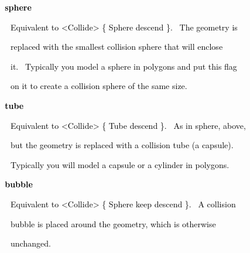 \documentclass[a4paper]{article}
\newcommand\textstyleOOoComputerKeyWord[1]{\textrm{\textcolor[rgb]{0.0,0.0,0.5019608}{#1}}}
\begin{document}
\clearpage
\bigskip


\bigskip

{\bfseries
\hypertarget{RefHeading7714869075401}{}\textstyleOOoComputerKeyWord{\textcolor{black}{\ \ \ \ sphere}}}


\bigskip

{\color{black}
\textstyleOOoComputerKeyWord{\textcolor{black}{\ \ \ \ \ \ Equivalent to {\textless}Collide{\textgreater} \{ Sphere
descend \}. \ The geometry is}}}

{\color{black}
\textstyleOOoComputerKeyWord{\textcolor{black}{\ \ \ \ \ \ replaced with the smallest collision sphere that will
enclose}}}

{\color{black}
\textstyleOOoComputerKeyWord{\textcolor{black}{\ \ \ \ \ \ it. \ Typically you model a sphere in polygons and put this
flag}}}

{\color{black}
\textstyleOOoComputerKeyWord{\textcolor{black}{\ \ \ \ \ \ on it to create a collision sphere of the same size.}}}


\bigskip

{\bfseries
\hypertarget{RefHeading7716869075401}{}\textstyleOOoComputerKeyWord{\textcolor{black}{\ \ \ \ tube}}}


\bigskip

{\color{black}
\textstyleOOoComputerKeyWord{\textcolor{black}{\ \ \ \ \ \ Equivalent to {\textless}Collide{\textgreater} \{ Tube
descend \}. \ As in sphere, above,}}}

{\color{black}
\textstyleOOoComputerKeyWord{\textcolor{black}{\ \ \ \ \ \ but the geometry is replaced with a collision tube (a
capsule).}}}

{\color{black}
\textstyleOOoComputerKeyWord{\textcolor{black}{\ \ \ \ \ \ Typically you will model a capsule or a cylinder in
polygons.}}}


\bigskip

{\bfseries
\hypertarget{RefHeading7718869075401}{}\textstyleOOoComputerKeyWord{\textcolor{black}{\ \ \ \ bubble}}}


\bigskip

{\color{black}
\textstyleOOoComputerKeyWord{\textcolor{black}{\ \ \ \ \ \ Equivalent to {\textless}Collide{\textgreater} \{ Sphere keep
descend \}. \ A collision}}}

{\color{black}
\textstyleOOoComputerKeyWord{\textcolor{black}{\ \ \ \ \ \ bubble is placed around the geometry, which is otherwise}}}

{\color{black}
\textstyleOOoComputerKeyWord{\textcolor{black}{\ \ \ \ \ \ unchanged.}}}
\end{document}

